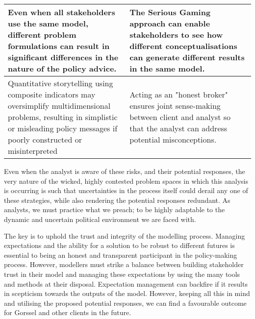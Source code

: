 \begin{table}[h!]
\begin{tabular}{p{}|p{}}
   \\ \hline
Even when all stakeholders use the same model, different problem formulations can result in significant differences in the nature of the policy advice. &  
  The Serious Gaming approach can enable stakeholders to see how different conceptualisations can generate different results in the same model. \\ \hline
Quantitative storytelling using composite indicators may oversimplify multidimensional problems, resulting in simplistic or misleading policy messages if poorly constructed or misinterpreted & Acting as an "honest broker" ensures joint sense-making between client and analyst so that the analyst can address potential misconceptions.\\ \hline
  
\end{tabular}
\end{table}

\noindent Even when the analyst is aware of these risks, and their potential responses, the very nature of the wicked, highly contested problem spaces in which this analysis is occurring is such that uncertainties in the process itself could derail any one of these strategies, while also rendering the potential responses redundant. As analysts, we must practice what we preach; to be highly adaptable to the dynamic and uncertain political environment we are faced with. 

The key is to uphold the trust and integrity of the modelling process. Managing expectations and the ability for a solution to be robust to different futures is essential to being an honest and transparent participant in the policy-making process. However, modellers must strike a balance between building stakeholder trust in their model and managing these expectations by using the many tools and methods at their disposal. Expectation management can backfire if it results in scepticism towards the outputs of the model. However, keeping all this in mind and utilising the proposed potential responses, we can find a favourable outcome for Gorssel and other clients in the future.